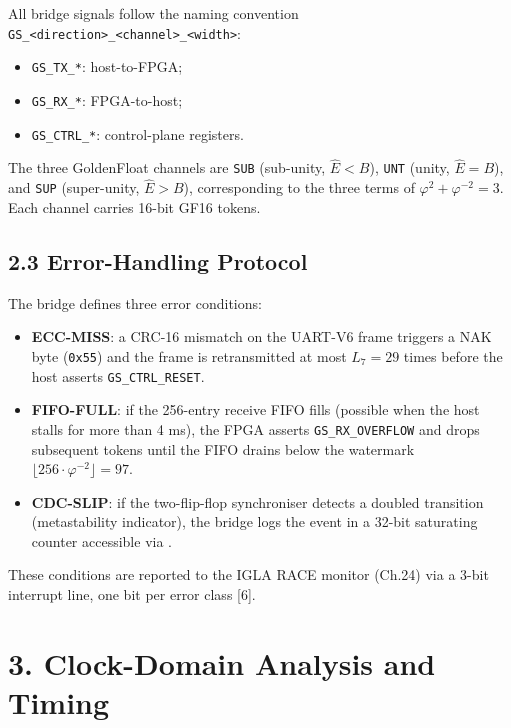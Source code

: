 All bridge signals follow the naming convention
\texttt{GS\_\textless{}direction\textgreater{}\_\textless{}channel\textgreater{}\_\textless{}width\textgreater{}}:

\begin{itemize}
\tightlist
\item
  \texttt{GS\_TX\_*}: host-to-FPGA;
\item
  \texttt{GS\_RX\_*}: FPGA-to-host;
\item
  \texttt{GS\_CTRL\_*}: control-plane registers.
\end{itemize}

The three GoldenFloat channels are \texttt{SUB}
(sub-unity, \(\hat E < B\)), \texttt{UNT} (unity,
\(\hat E = B\)), and \texttt{SUP} (super-unity,
\(\hat E > B\)), corresponding to the three terms
of \(\varphi^2 + \varphi^{-2} = 3\). Each channel
carries 16-bit GF16 tokens.

\subsection{2.3 Error-Handling
Protocol}\label{fa_12:error-handling-protocol}

The bridge defines three error conditions:

\begin{itemize}
\tightlist
\item
  \textbf{ECC-MISS}: a CRC-16 mismatch on the
  UART-V6 frame triggers a NAK byte
  (\texttt{0x55}) and the frame is retransmitted
  at most \(L_7 = 29\) times before the host
  asserts \texttt{GS\_CTRL\_RESET}.
\item
  \textbf{FIFO-FULL}: if the 256-entry receive
  FIFO fills (possible when the host stalls for
  more than 4 ms), the FPGA asserts
  \texttt{GS\_RX\_OVERFLOW} and drops subsequent
  tokens until the FIFO drains below the watermark
  \(\lfloor 256 \cdot \varphi^{-2} \rfloor = 97\).
\item
  \textbf{CDC-SLIP}: if the two-flip-flop
  synchroniser detects a doubled transition
  (metastability indicator), the bridge logs the
  event in a 32-bit saturating counter accessible
  via .
\end{itemize}

These conditions are reported to the IGLA RACE
monitor (Ch.24) via a 3-bit interrupt line, one
bit per error class [6].

\section{3. Clock-Domain Analysis and
Timing}\label{fa_12:clock-domain-analysis-and-timing}

